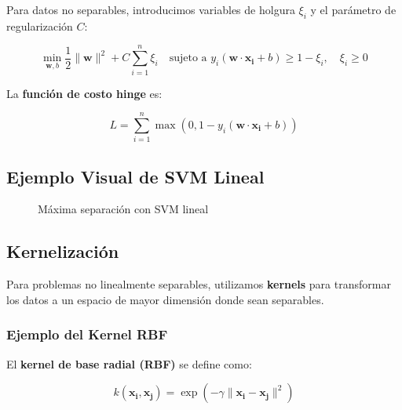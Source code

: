 \documentclass[a4paper, 11pt]{article}
\begin{document}
Para datos no separables, introducimos variables de holgura $\xi_i$ y el parámetro de regularización $C$:

\[
\min_{\mathbf{w}, b} \frac{1}{2} \|\mathbf{w}\|^2 + C \sum_{i=1}^{n} \xi_i \quad \text{sujeto a } y_i (\mathbf{w} \cdot \mathbf{x_i} + b) \geq 1 - \xi_i, \quad \xi_i \geq 0
\]

La \textbf{función de costo hinge} es:

\[
L = \sum_{i=1}^{n} \max(0, 1 - y_i (\mathbf{w} \cdot \mathbf{x_i} + b))
\]

\subsection{Ejemplo Visual de SVM Lineal}

\begin{figure}[h!]
    \centering
    \caption{Máxima separación con SVM lineal}
\end{figure}

\subsection{Kernelización}

Para problemas no linealmente separables, utilizamos \textbf{kernels} para transformar los datos a un espacio de mayor dimensión donde sean separables.
\subsubsection{Ejemplo del Kernel RBF}

El \textbf{kernel de base radial (RBF)} se define como:

\[
k(\mathbf{x_i}, \mathbf{x_j}) = \exp(-\gamma \|\mathbf{x_i} - \mathbf{x_j}\|^2)
\]
\end{document}
